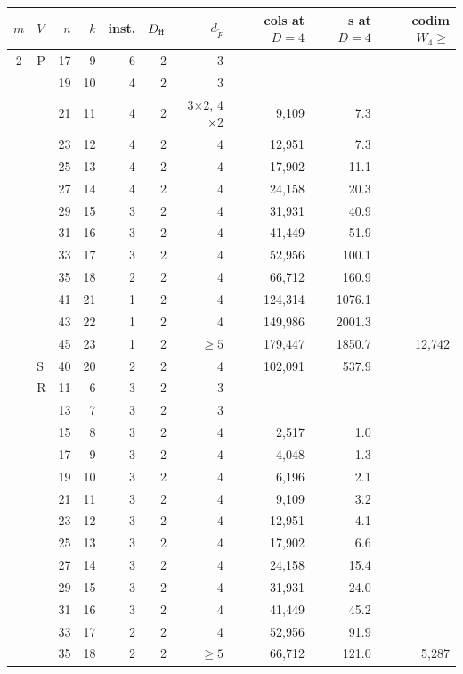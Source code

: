 \begin{tabular}{@{}clrrrrrrrr@{}}
\toprule
$m$ & $V$ & $n$ & $k$ & inst. & $D_{\rm ff}$ & $d_{\tilde F}$ & cols at $D=4$ & s at $D=4$ & codim $W_4\ge$ \\
\midrule
2 & P & 17 & 9 & 6 & 2 & 3 &  &  &  \\
 &  & 19 & 10 & 4 & 2 & 3 &  &  &  \\
 &  & 21 & 11 & 4 & 2 & 3$\times$2, 4$\times$2 & 9{,}109 & 7.3 &  \\
 &  & 23 & 12 & 4 & 2 & 4 & 12{,}951 & 7.3 &  \\
 &  & 25 & 13 & 4 & 2 & 4 & 17{,}902 & 11.1 &  \\
 &  & 27 & 14 & 4 & 2 & 4 & 24{,}158 & 20.3 &  \\
 &  & 29 & 15 & 3 & 2 & 4 & 31{,}931 & 40.9 &  \\
 &  & 31 & 16 & 3 & 2 & 4 & 41{,}449 & 51.9 &  \\
 &  & 33 & 17 & 3 & 2 & 4 & 52{,}956 & 100.1 &  \\
 &  & 35 & 18 & 2 & 2 & 4 & 66{,}712 & 160.9 &  \\
 &  & 41 & 21 & 1 & 2 & 4 & 124{,}314 & 1076.1 &  \\
 &  & 43 & 22 & 1 & 2 & 4 & 149{,}986 & 2001.3 &  \\
 &  & 45 & 23 & 1 & 2 & $\ge5$ & 179{,}447 & 1850.7 & 12{,}742 \\
\addlinespace
 & S & 40 & 20 & 2 & 2 & 4 & 102{,}091 & 537.9 &  \\
\addlinespace
 & R & 11 & 6 & 3 & 2 & 3 &  &  &  \\
 &  & 13 & 7 & 3 & 2 & 3 &  &  &  \\
 &  & 15 & 8 & 3 & 2 & 4 & 2{,}517 & 1.0 &  \\
 &  & 17 & 9 & 3 & 2 & 4 & 4{,}048 & 1.3 &  \\
 &  & 19 & 10 & 3 & 2 & 4 & 6{,}196 & 2.1 &  \\
 &  & 21 & 11 & 3 & 2 & 4 & 9{,}109 & 3.2 &  \\
 &  & 23 & 12 & 3 & 2 & 4 & 12{,}951 & 4.1 &  \\
 &  & 25 & 13 & 3 & 2 & 4 & 17{,}902 & 6.6 &  \\
 &  & 27 & 14 & 3 & 2 & 4 & 24{,}158 & 15.4 &  \\
 &  & 29 & 15 & 3 & 2 & 4 & 31{,}931 & 24.0 &  \\
 &  & 31 & 16 & 3 & 2 & 4 & 41{,}449 & 45.2 &  \\
 &  & 33 & 17 & 2 & 2 & 4 & 52{,}956 & 91.9 &  \\
 &  & 35 & 18 & 2 & 2 & $\ge5$ & 66{,}712 & 121.0 & 5{,}287 \\

\end{tabular}
